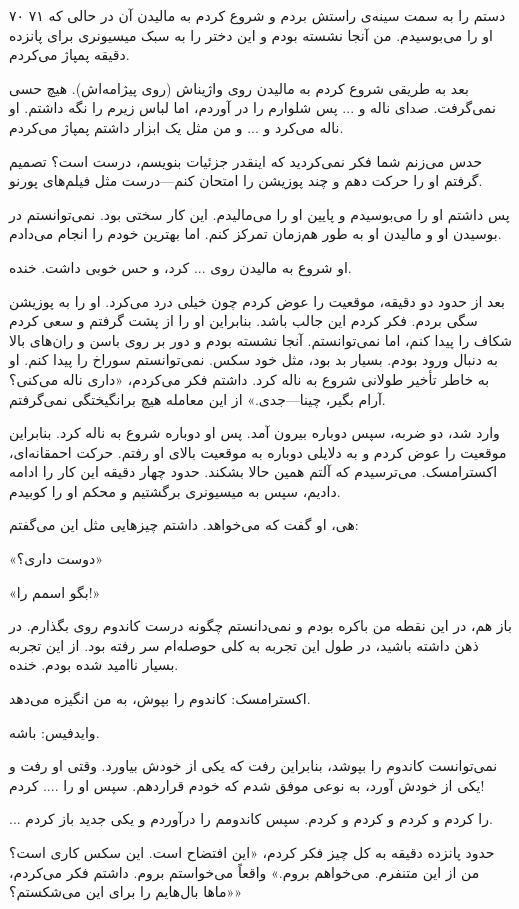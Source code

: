 ۷۰ ۷۱  
دستم را به سمت سینه‌ی راستش بردم و شروع کردم به مالیدن آن در حالی که او را می‌بوسیدم. من آنجا نشسته بودم و این دختر را به سبک میسیونری برای پانزده دقیقه پمپاژ می‌کردم.

بعد به طریقی شروع کردم به مالیدن روی واژیناش (روی پیژامه‌اش). هیچ حسی نمی‌گرفت. صدای ناله و ... پس شلوارم را در آوردم، اما لباس زیرم را نگه داشتم. او ناله می‌کرد و ... و من مثل یک ابزار داشتم پمپاژ می‌کردم.

حدس می‌زنم شما فکر نمی‌کردید که اینقدر جزئیات بنویسم، درست است؟ تصمیم گرفتم او را حرکت دهم و چند پوزیشن را امتحان کنم—درست مثل فیلم‌های پورنو.

پس داشتم او را می‌بوسیدم و پایین او را می‌مالیدم. این کار سختی بود. نمی‌توانستم در بوسیدن او و مالیدن او به طور هم‌زمان تمرکز کنم. اما بهترین خودم را انجام می‌دادم.

او شروع به مالیدن روی ... کرد، و حس خوبی داشت. خنده.

بعد از حدود دو دقیقه، موقعیت را عوض کردم چون خیلی درد می‌کرد. او را به پوزیشن سگی بردم. فکر کردم این جالب باشد. بنابراین او را از پشت گرفتم و سعی کردم شکاف را پیدا کنم، اما نمی‌توانستم. آنجا نشسته بودم و دور بر روی باسن و ران‌های بالا به دنبال ورود بودم. بسیار بد بود، مثل خود سکس. نمی‌توانستم سوراخ را پیدا کنم. او به خاطر تأخیر طولانی شروع به ناله کرد. داشتم فکر می‌کردم، «داری ناله می‌کنی؟ آرام بگیر، چینا—جدی.» از این معامله هیچ برانگیختگی نمی‌گرفتم.

وارد شد، دو ضربه، سپس دوباره بیرون آمد. پس او دوباره شروع به ناله کرد. بنابراین موقعیت را عوض کردم و به دلایلی دوباره به موقعیت بالای او رفتم. حرکت احمقانه‌ای، اکسترامسک. می‌ترسیدم که آلتم همین حالا بشکند. حدود چهار دقیقه این کار را ادامه دادیم، سپس به میسیونری برگشتیم و محکم او را کوبیدم.

هی، او گفت که می‌خواهد. داشتم چیزهایی مثل این می‌گفتم:

«دوست داری؟»

«بگو اسمم را!»

باز هم، در این نقطه من باکره بودم و نمی‌دانستم چگونه درست کاندوم روی بگذارم. در ذهن داشته باشید، در طول این تجربه به کلی حوصله‌ام سر رفته بود. از این تجربه بسیار ناامید شده بودم. خنده.

اکسترامسک: کاندوم را بپوش، به من انگیزه می‌دهد.

وایدفیس: باشه.

نمی‌توانست کاندوم را بپوشد، بنابراین رفت که یکی از خودش بیاورد. وقتی او رفت و یکی از خودش آورد، به نوعی موفق شدم که خودم قراردهم. سپس او را .... کردم!

... را کردم و کردم و کردم و کردم. سپس کاندومم را درآوردم و یکی جدید باز کردم.

حدود پانزده دقیقه به کل چیز فکر کردم، «این افتضاح است. این سکس کاری است؟ من از این متنفرم. می‌خواهم بروم.» واقعاً می‌خواستم بروم. داشتم فکر می‌کردم، «ماها بال‌هایم را برای این می‌شکستم؟»
